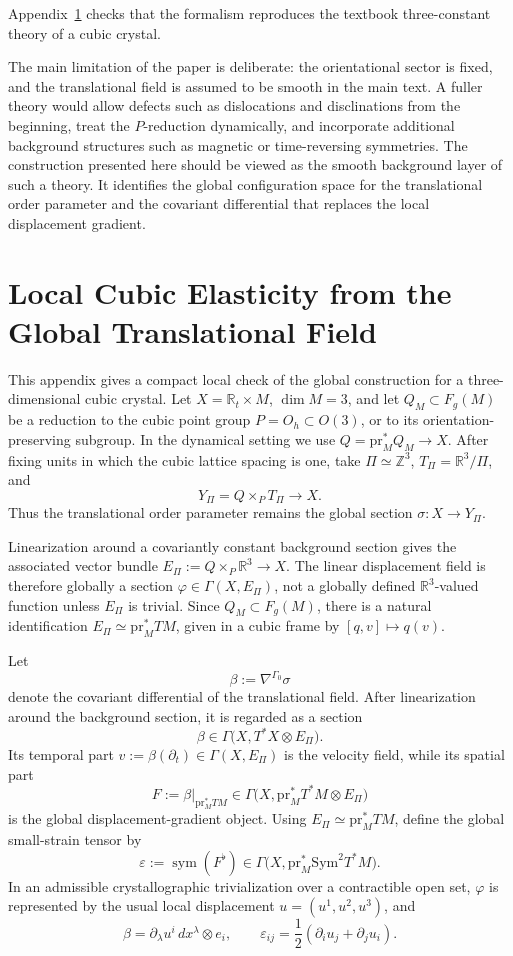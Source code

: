 \documentclass[11pt]{amsart}
\theoremstyle{plain}
\theoremstyle{definition}
\theoremstyle{remark}
\begin{document}
Appendix~\ref{app:cubic_example} checks that the formalism reproduces the textbook three-constant theory of a cubic crystal.

The main limitation of the paper is deliberate: the orientational sector is fixed, and the translational field is assumed to be smooth in the main text. 
A fuller theory would allow defects such as dislocations and disclinations from the beginning, treat the \(P\)-reduction dynamically, and incorporate additional background structures such as magnetic or time-reversing symmetries. 
The construction presented here should be viewed as the smooth background layer of such a theory. 
It identifies the global configuration space for the translational order parameter and the covariant differential that replaces the local displacement gradient.

\appendix


\section{Local Cubic Elasticity from the Global Translational Field}
\label{app:cubic_example}

This appendix gives a compact local check of the global construction for a three-dimensional cubic crystal. 
Let \(X=\mathbb R_t\times M\), \(\dim M=3\), and let \(Q_M\subset F_g(M)\) be a reduction to the cubic point group \(P=O_h\subset O(3)\), or to its orientation-preserving subgroup. 
In the dynamical setting we use \(Q=\mathrm{pr}_M^*Q_M\to X\). 
After fixing units in which the cubic lattice spacing is one, take \(\Pi\simeq\mathbb Z^3\), \(T_\Pi=\mathbb R^3/\Pi\), and
\[
Y_\Pi=Q\times_P T_\Pi\to X.
\]
Thus the translational order parameter remains the global section \(\sigma:X\to Y_\Pi\).

Linearization around a covariantly constant background section gives the associated vector bundle \(E_\Pi:=Q\times_P\mathbb R^3\to X\). 
The linear displacement field is therefore globally a section \(\varphi\in\Gamma(X,E_\Pi)\), not a globally defined \(\mathbb R^3\)-valued function unless \(E_\Pi\) is trivial. 
Since \(Q_M\subset F_g(M)\), there is a natural identification \(E_\Pi\simeq\mathrm{pr}_M^*TM\), given in a cubic frame by \([q,v]\mapsto q(v)\).

Let
\[
\beta:=\nabla^{\Gamma_0}\sigma
\]
denote the covariant differential of the translational field. 
After linearization around the background section, it is regarded as a section
\[
\beta\in
\Gamma\bigl(X,T^*X\otimes E_\Pi\bigr).
\]
Its temporal part \(v:=\beta(\partial_t)\in\Gamma(X,E_\Pi)\) is the velocity field, while its spatial part
\[
F:=\beta|_{\mathrm{pr}_M^*TM}
\in
\Gamma\bigl(X,\mathrm{pr}_M^*T^*M\otimes E_\Pi\bigr)
\]
is the global displacement-gradient object. 
Using \(E_\Pi\simeq\mathrm{pr}_M^*TM\), define the global small-strain tensor by
\[
\varepsilon:=\operatorname{sym}(F^\flat)
\in
\Gamma\bigl(X,\mathrm{pr}_M^*\mathrm{Sym}^2T^*M\bigr).
\]
In an admissible crystallographic trivialization over a contractible open set, \(\varphi\) is represented by the usual local displacement \(u=(u^1,u^2,u^3)\), and
\[
\beta=\partial_\lambda u^i\,dx^\lambda\otimes e_i,
\qquad
\varepsilon_{ij}=\frac12(\partial_i u_j+\partial_j u_i).
\]
\end{document}
